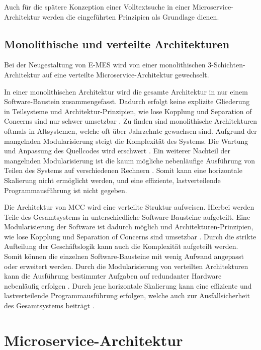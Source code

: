 Auch für die spätere Konzeption einer Volltextsuche in einer Microservice-Architektur werden die eingeführten Prinzipien als Grundlage dienen.

\subsection{Monolithische und verteilte Architekturen\label{subsec2.2.2:Unterunterpunkt-2}}

Bei der Neugestaltung von E-MES wird von einer monolithischen 3-Schichten-Architektur auf eine verteilte Microservice-Architektur gewechselt.

In einer monolithischen Architektur wird die gesamte Architektur in nur einem Software-Baustein zusammengefasst. Dadurch erfolgt keine explizite Gliederung in Teilsysteme und Architektur-Prinzipien, wie lose Kopplung und Separation of Concerns sind nur schwer umsetzbar \cite[S. 216]{Vogel.2009}. Zu finden sind monolithische Architekturen oftmals in Altsystemen, welche oft über Jahrzehnte gewachsen sind. Aufgrund der mangelnden Modularisierung steigt die Komplexität des Systems. Die Wartung und Anpassung des Quellcodes wird erschwert \cite{Prof.Dr.AndreasFink.2012b}. Ein weiterer Nachteil der mangelnden Modularisierung ist die kaum mögliche nebenläufige Ausführung von Teilen des Systems auf verschiedenen Rechnern \cite{Prof.Dr.AndreasFink.2012b}. Somit kann eine horizontale Skalierung nicht ermöglicht werden, und eine effiziente, lastverteilende Programmausführung ist nicht gegeben.

Die Architektur von MCC wird eine verteilte Struktur aufweisen. Hierbei werden Teile des Gesamtsystems in unterschiedliche Software-Bausteine aufgeteilt. Eine Modularisierung der Software ist dadurch möglich und Architekturen-Prinzipien, wie lose Kopplung und Separation of Concerns sind umsetzbar \cite{Vogel.2009}. Durch die strikte Aufteilung der Geschäftslogik kann auch die Komplexität aufgeteilt werden. Somit können die einzelnen Software-Bausteine mit wenig Aufwand angepasst oder erweitert werden. Durch die Modularisierung von verteilten Architekturen kann die Ausführung bestimmter Aufgaben auf redundanter Hardware nebenläufig erfolgen \cite{Prof.Dr.AndreasFink.2012}. Durch jene horizontale Skalierung kann eine effiziente und lastverteilende Programmausführung erfolgen, welche auch zur Ausfallsicherheit des Gesamtsystems beiträgt \cite{Prof.Dr.AndreasFink.2012}.

\section{Microservice-Architektur\label{sec2.3:Unterpunkt-3}}

